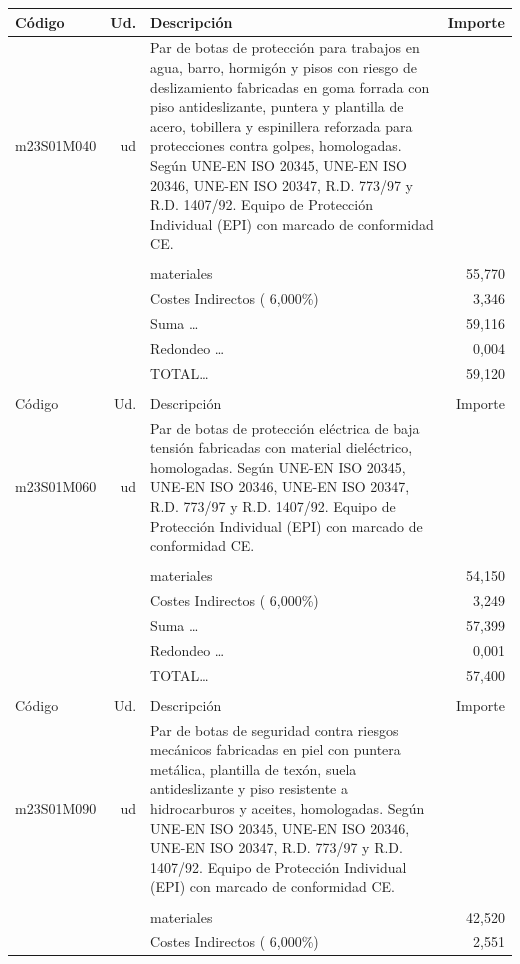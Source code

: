 \begin{supertabular}{l r p{60mm} r}
Código&Ud.&Descripción&Importe\\%
\hline%
m23S01M040&ud&Par de botas de protección para trabajos en agua, barro, hormigón y pisos con riesgo de deslizamiento fabricadas en goma forrada con piso antideslizante, puntera y plantilla de acero, tobillera y espinillera reforzada para protecciones contra golpes, homologadas. Según UNE{-}EN ISO 20345, UNE{-}EN ISO 20346, UNE{-}EN ISO 20347, R.D. 773/97 y R.D. 1407/92. Equipo de Protección Individual (EPI) con marcado de conformidad CE.&\\%
&&&\\%
&&materiales&    55,770\\%
&&Costes Indirectos (     6,000\%)&     3,346\\%
&&Suma \ldots&    59,116\\%
&&Redondeo \ldots&     0,004\\%
%
&&TOTAL\ldots&    59,120\\%
&&&\\%
Código&Ud.&Descripción&Importe\\%
\hline%
m23S01M060&ud&Par de botas de protección eléctrica de baja tensión fabricadas con material dieléctrico, homologadas. Según UNE{-}EN ISO 20345, UNE{-}EN ISO 20346, UNE{-}EN ISO 20347, R.D. 773/97 y R.D. 1407/92. Equipo de Protección Individual (EPI) con marcado de conformidad CE.&\\%
&&&\\%
&&materiales&    54,150\\%
&&Costes Indirectos (     6,000\%)&     3,249\\%
&&Suma \ldots&    57,399\\%
&&Redondeo \ldots&     0,001\\%
%
&&TOTAL\ldots&    57,400\\%
&&&\\%
Código&Ud.&Descripción&Importe\\%
\hline%
m23S01M090&ud&Par de botas de seguridad contra riesgos mecánicos fabricadas en piel con puntera metálica, plantilla de texón, suela antideslizante y piso resistente a hidrocarburos y aceites, homologadas. Según UNE{-}EN ISO 20345, UNE{-}EN ISO 20346, UNE{-}EN ISO 20347, R.D. 773/97 y R.D. 1407/92. Equipo de Protección Individual (EPI) con marcado de conformidad CE.&\\%
&&&\\%
&&materiales&    42,520\\%
&&Costes Indirectos (     6,000\%)&     2,551\\%

\end{supertabular}
